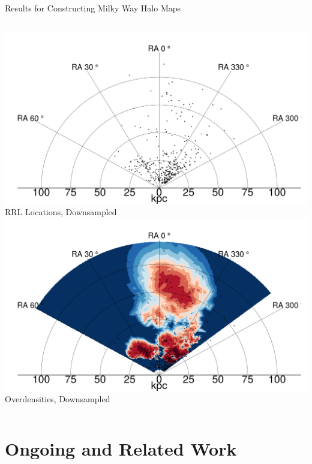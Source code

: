 \documentclass[12pt]{beamer}
\begin{document}
\begin{frame}{Results for Constructing Milky Way Halo Maps}
\begin{columns}
    \begin{column}{0.5\textwidth}
      \begin{center}
    \includegraphics[scale=\tw]{figs/density_rr_model_sampled_points.png}\\
    RRL Locations, Downsampled\\
    \includegraphics[scale=\tw]{figs/density_rr_model_sampled.png}\\
    Overdensities, Downsampled
    \end{center}
  \end{column}

\end{columns}
\end{frame}


\section{Ongoing and Related Work}
\end{document}

